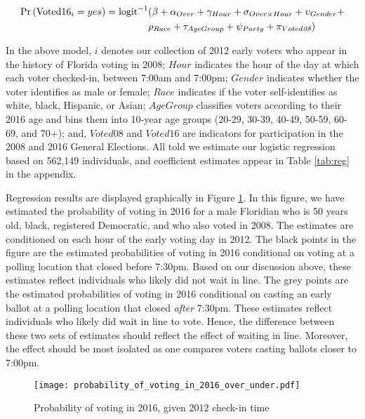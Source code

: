 \documentclass[12pt,titlepage]{article}
\begin{document}
\begin{equation*}
  \begin{aligned}
    \textup{Pr}\left(\mathrm{Voted16}_{i} = yes\right) =  \textup{logit}^{-1}&(\beta + \alpha_{Over} + \gamma_{Hour} +
    \sigma_{Over \times Hour} + \upsilon_{Gender}  + \\& \rho_{Race} +
      \tau_{Age Group} + \psi_{Party} + \pi_{Voted\emph{08}})
  \end{aligned}
\end{equation*}

In the above model, $i$ denotes our collection of 2012 early voters
who appear in the history of Florida voting in 2008; $Hour$ indicates
the hour of the day at which each voter checked-in, between 7:00am and
7:00pm; $Gender$ indicates whether the voter identifies as male or
female; $Race$ indicates if the voter self-identifies as white, black,
Hispanic, or Asian; $AgeGroup$ classifies voters according to their
2016 age and bins them into 10-year age groups (20-29, 30-39, 40-49,
50-59, 60-69, and 70+); and, $Voted08$ and $Voted16$ are indicators
for participation in the 2008 and 2016 General Elections.  All told we
estimate our logistic regression based on 562,149 individuals, and
coefficient estimates appear in Table \ref{tab:reg} in the appendix.

Regression results are displayed graphically in Figure
\ref{fig:prvoting2016}. In this figure, we have estimated the
probability of voting in 2016 for a male Floridian who is 50 years
old, black, registered Democratic, and who also voted in 2008.  The
estimates are conditioned on each hour of the early voting day in
2012. The black points in the figure are the estimated probabilities
of voting in 2016 conditional on voting at a polling location that
closed before 7:30pm.  Based on our discussion above, these estimates
reflect individuals who likely did not wait in line.  The grey points
are the estimated probabilities of voting in 2016 conditional on
casting an early ballot at a polling location that closed \emph{after}
7:30pm.  These estimates reflect individuals who likely did wait in
line to vote.  Hence, the difference between these two sets of
estimates should reflect the effect of waiting in line.  Moreover, the
effect should be most isolated as one compares voters casting ballots
closer to 7:00pm.

\begin{figure}[!ht]
\caption{Probability of voting in 2016, given 2012 check-in time}
  \label{fig:prvoting2016}
  \centering
    \centering\texttt{[image: probability\_of\_voting\_in\_2016\_over\_under.pdf]}
\end{figure}
\end{document}
